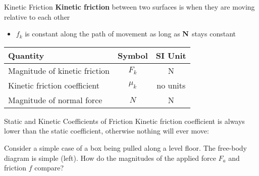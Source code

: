 \documentclass[12pt,compress,aspectratio=169]{beamer}
\newcommand{\mb}[1]{\ensuremath\mathbf{#1}}
\newcommand{\eq}[2]{\vspace{#1}{\Large\begin{displaymath}#2\end{displaymath}}}
\begin{document}
\begin{frame}{Kinetic Friction}
  \textbf{Kinetic friction} between two surfaces is when they are moving
  relative to each other
  \begin{itemize}
  \item $f_k$ is constant along the path of movement as long as $\mb{N}$
    stays constant
  \end{itemize}

  \eq{-.3in}{\boxed{f_k = \mu_kN}}
  \begin{center}
    \begin{tabular}{l|c|c}
      \rowcolor{pink}
      \textbf{Quantity} & \textbf{Symbol} & \textbf{SI Unit} \\ \hline
      Magnitude of kinetic friction & $F_k$ & \si{\newton} \\
      Kinetic friction coefficient  & $\mu_k$ & no units \\
      Magnitude of normal force     & $N$ & \si{\newton}
    \end{tabular}
  \end{center}
\end{frame}



\begin{frame}{Static and Kinetic Coefficients of Friction}    
  Kinetic friction coefficient is always lower than the static coefficient,
  otherwise nothing will ever move:
    
  \eq{-.4in}{\mu_k\leq\mu_s}

  Consider a simple case of a box being pulled along a level floor. The
  free-body diagram is simple (left). How do the magnitudes of the applied
  force $F_a$ and friction $f$ compare?
  \begin{columns}
    \begin{center}
    \end{center}

    \begin{center}
    \end{center}
  \end{columns}
\end{frame}
\end{document}

